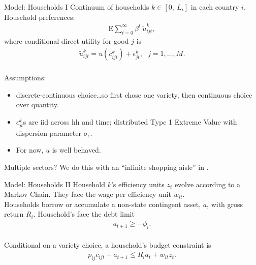 \documentclass[9pt,pdftex,aspectratio=1610]{beamer}
\theoremstyle{definition}
\begin{document}

\begin{frame}[t]{Model: Households I}
\smallskip
Continuum of households $k \in [0, \ L_i]$ in each country $i$. Household preferences:
\begin{align*}
\mathrm{E}\sum_{t = 0}^{\infty} \beta^{t} \ \tilde{u}^k_{ijt},
\end{align*}
where conditional direct utility for good $j$ is
\begin{align*}
\tilde{u}^k_{ijt} =  u(c^k_{ijt}) + \epsilon^k_{jt}, \ \ \ j = 1, \ldots, M.
\end{align*}\\
\medskip
Assumptions:
\begin{itemize}
\item discrete-continuous choice\ldots so first chose one variety, then continuous choice over quantity.
\smallskip
\item $\epsilon^k_{jt}$s are iid across hh and time; distributed Type 1 Extreme Value with dispersion parameter $\sigma_{\epsilon}$.
\smallskip
\item For now, $u$ is well behaved.
\end{itemize}
\bigskip
Multiple sectors? We do this with an ``infinite shopping aisle'' in \citet{p-iq}.
\end{frame}


\begin{frame}[t]{Model: Households II}
\smallskip
Household $k$'s efficiency units $z_t$ evolve according to a Markov Chain. They face the wage per efficiency unit $w_{it}$.\\
\bigskip
\medskip
Households borrow or accumulate a non-state contingent asset, $a$, with gross return $R_{i}$. Household's face the debt limit
\begin{align*}
a_{t+1} \geq - \phi_{i}.
\end{align*}\\
\bigskip
\medskip
Conditional on a variety choice, a household's budget constraint is
\begin{align*}
p_{ij}c_{ijt} +  a_{t+1} \leq    R_{i} a_{t} + w_{it} z_{t}.
\end{align*}
\end{frame}
\end{document}
